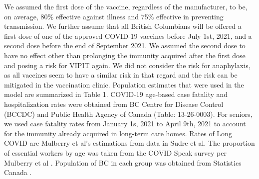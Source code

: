 \documentclass[]{interact}
\theoremstyle{plain}%
\theoremstyle{definition}
\theoremstyle{remark}
\begin{document}
\begin{table}
{\begin{tabular}{llllll}
 \bottomrule 

\end{tabular}}
\label{harm-param}
\end{table}

We assumed the first dose of the vaccine, regardless of the
manufacturer, to be, on average, 80\% effective against illness and 75\%
effective in preventing transmission. We further assume that all British
Columbians will be offered a first dose of one of the approved COVID-19
vaccines before July 1st, 2021, and a second dose before the end of
September 2021. We assumed the second dose to have no effect other than
prolonging the immunity acquired after the first dose and posing a risk
for VIPIT again. We did not consider the risk for anaphylaxis, as all
vaccines seem to have a similar risk in that regard and the risk can be
mitigated in the vaccination clinic. Population estimates that were used
in the model are summarized in Table 1. COVID-19 age-based case fatality
and hospitalization rates were obtained from BC Centre for Disease
Control (BCCDC) \citep{bccdc_british_2021} and Public Health Agency of
Canada (Table: 13-26-0003)\citep{statistics_canada_preliminary_2021}.
For seniors, we used case fatality rates from January 1s, 2021 to April
9th, 2021 to account for the immunity already acquired in long-term care
homes. Rates of Long COVID are Mulberry et al's estimations from data in
Sudre et al\citep{sudre_attributes_2021}. The proportion of essential
workers by age was taken from the COVID Speak survey per Mulberry et al
\citep{mulberry_vaccine_2021}. Population of BC in each group was
obtained from Statistics Canada \citep{statistics_canada_census_2017}.
\end{document}
